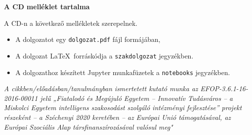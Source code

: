 \pagestyle{empty}

\noindent \textbf{\Large A CD melléklet tartalma}

\vskip 1cm

\noindent A CD-n a következő mellékletek szerepelnek.
\begin{itemize}
\item A dolgozatot egy \texttt{dolgozat.pdf} fájl formájában,
\item A dolgozat \LaTeX\ forráskódja a \texttt{szakdolgozat} jegyzékben.
\item A dolgozathoz készített Jupyter munkafüzetek a \texttt{notebooks} jegyzékben.
\end{itemize}

\vskip 17cm

\emph{A cikkben/előadásban/tanulmányban ismertetett kutató munka az
EFOP-3.6.1-16-2016-00011 jelű „Fiatalodó és Megújuló Egyetem –
Innovatív Tudásváros – a Miskolci Egyetem intelligens szakosodást
szolgáló intézményi fejlesztése” projekt részeként – a
Széchenyi 2020 keretében – az Európai Unió támogatásával, az
Európai Szociális Alap társfinanszírozásával valósul meg"}
